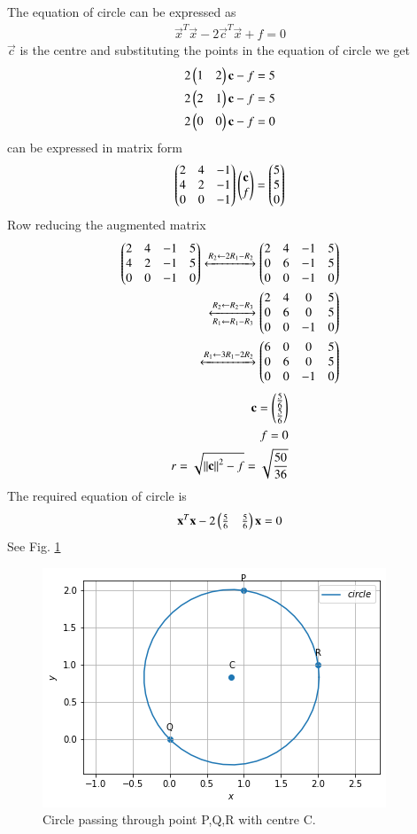 The equation of circle can be expressed as
\begin{align}
    \vec{x}^T\vec{x}-2\vec{c}^T\vec{x}+f = 0
\end{align}
$\vec{c}$ is the centre  and substituting the points in the equation of circle we get
\begin{align}
2\begin{pmatrix}1&2\end{pmatrix}\mathbf{c}-f=5\\
2\begin{pmatrix}2&1\end{pmatrix}\mathbf{c}-f=5\\
2\begin{pmatrix}0&0\end{pmatrix}\mathbf{c}-f=0
\end{align}
can be expressed in matrix form
\begin{align}
\begin{pmatrix}2&4&-1\\4&2&-1\\0&0&-1\end{pmatrix}\begin{pmatrix}\mathbf{c}\\f\end{pmatrix} = \begin{pmatrix}5\\5\\0\end{pmatrix}
\end{align}
Row reducing the augmented matrix
\begin{align}
\begin{pmatrix}2&4&-1&5\\4&2&-1&5\\0&0&-1&0\end{pmatrix}
\xleftrightarrow{R_2\leftarrow 2R_1-R_2}
\begin{pmatrix}2&4&-1&5\\0&6&-1&5\\0&0&-1&0\end{pmatrix}\\
\xleftrightarrow[R_1\leftarrow R_1-R_3]{R_2\leftarrow R_2-R_3}
\begin{pmatrix}2&4&0&5\\0&6&0&5\\0&0&-1&0\end{pmatrix}\\
\xleftrightarrow{R_1\leftarrow 3R_1-2R_2}
\begin{pmatrix}6&0&0&5\\0&6&0&5\\0&0&-1&0\end{pmatrix}
\end{align}
\begin{align}
    \mathbf{c} = \begin{pmatrix}\frac{5}{6}\\\frac{5}{6}\end{pmatrix}\\
    f = 0\\
    r=\sqrt{\left\lVert\mathbf{c}\right\rVert^2-f} = \sqrt{\frac{50}{36}}
\end{align}
The required equation of circle is 
\begin{align}
\mathbf{x}^T\mathbf{x}-2\begin{pmatrix}\frac{5}{6}&\frac{5}{6}\end{pmatrix}\mathbf{x} = 0
\end{align}
See Fig. \ref{eq:solutions/4/1/2/Fig1}

\begin{figure}[!ht]
\centering
\includegraphics[width=\columnwidth]{./solutions/4/1/2/Circle.png}
\caption{Circle passing through point P,Q,R with centre C.}
\label{eq:solutions/4/1/2/Fig1}
\end{figure}
